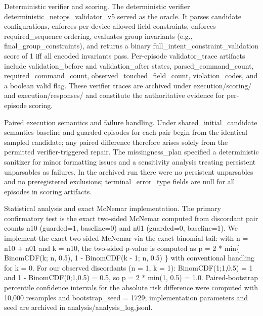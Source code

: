 \documentclass[conference]{IEEEtran}
\begin{document}
Deterministic verifier and scoring. The deterministic verifier deterministic\_netops\_validator\_v5 served as the oracle. It parses candidate configurations, enforces per-device allowed-field constraints, enforces required\_sequence ordering, evaluates group invariants (e.g., final\_group\_constraints), and returns a binary full\_intent\_constraint\_validation score of 1 iff all encoded invariants pass. Per-episode validator\_trace artifacts include validation\_before and validation\_after states, parsed\_command\_count, required\_command\_count, observed\_touched\_field\_count, violation\_codes, and a boolean valid flag. These verifier traces are archived under execution/scoring/ and execution/responses/ and constitute the authoritative evidence for per-episode scoring.

Paired execution semantics and failure handling. Under shared\_initial\_candidate semantics baseline and guarded episodes for each pair begin from the identical sampled candidate; any paired difference therefore arises solely from the permitted verifier-triggered repair. The missingness\_plan specified a deterministic sanitizer for minor formatting issues and a sensitivity analysis treating persistent unparsables as failures. In the archived run there were no persistent unparsables and no preregistered exclusions; terminal\_error\_type fields are null for all episodes in scoring artifacts.

Statistical analysis and exact McNemar implementation. The primary confirmatory test is the exact two-sided McNemar computed from discordant pair counts n10 (guarded=1, baseline=0) and n01 (guarded=0, baseline=1). We implement the exact two-sided McNemar via the exact binomial tail: with n = n10 + n01 and k = n10, the two-sided p-value is computed as
p = 2 * min\{ BinomCDF(k; n, 0.5), 1 - BinomCDF(k - 1; n, 0.5) \}
with conventional handling for k = 0. For our observed discordants (n = 1, k = 1): BinomCDF(1;1,0.5) = 1 and 1 - BinomCDF(0;1,0.5) = 0.5, so p = 2 * min(1, 0.5) = 1.0. Paired-bootstrap percentile confidence intervals for the absolute risk difference were computed with 10,000 resamples and bootstrap\_seed = 1729; implementation parameters and seed are archived in analysis/analysis\_log.jsonl.
\end{document}
